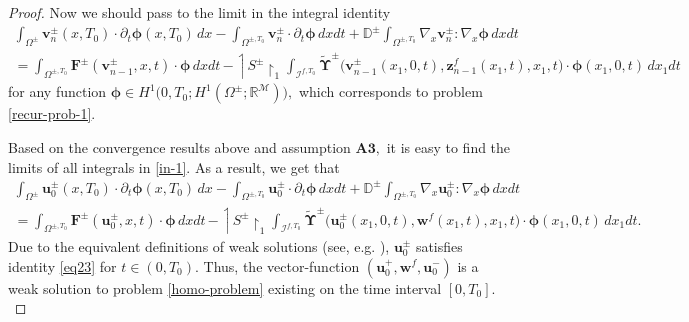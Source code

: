\documentclass[reqno]{amsart}            %
\numberwithin{equation}{section}
\begin{document}
\begin{proof}
		Now we should pass to the limit in the integral identity 
		\begin{multline}\label{in-1}
			\int_{\Omega^{\pm}} \mathbf{v}^{\pm}_n(x, T_0) \cdot \partial_t \boldsymbol{\phi}(x, T_0) \, dx	- \int_{\Omega^{\pm, T_0}} \mathbf{v}^{\pm}_n \cdot \partial_t \boldsymbol{\phi} \, dxdt + \mathbb{D}^\pm \int_{\Omega^{\pm, T_0}} \nabla_x  \mathbf{v}^{\pm}_n :  \nabla_x\boldsymbol{\phi}\,dxdt 
			\\
			= \int_{\Omega^{\pm, T_0}} \mathbf{F}^\pm(\mathbf{v}^\pm_{n-1},x, t) \cdot \boldsymbol{\phi}\, dxdt  \, - 
			\upharpoonleft\!\! {S}^\pm\!\!\upharpoonright_1 \int_{\mathcal{I}^{f, T_0}} \widetilde{\boldsymbol{\Upsilon}}^\pm\big(\mathbf{v}^\pm_{n-1}(x_1,0,t), \mathbf{z}^{f}_{n-1}(x_1,t), x_1, t \big) \cdot \boldsymbol{\phi}(x_1,0,t)\, dx_1 dt
		\end{multline}
		for any function $\boldsymbol{\phi} \in H^1\big(0,T_0; H^1(\Omega^\pm; \mathbb{R}^\mathcal{M})\big),$ which corresponds to problem \eqref{recur-prob-1}.
		
		Based on the convergence results above and assumption $\mathbf{A3},$ it is easy to find the limits of all integrals in \eqref{in-1}.
		As a result, we get that 
		\begin{multline}\label{in-2}
			\int_{\Omega^{\pm}} \mathbf{u}^{\pm}_0(x, T_0) \cdot \partial_t \boldsymbol{\phi}(x, T_0) \, dx	- \int_{\Omega^{\pm, T_0}} \mathbf{u}^{\pm}_0 \cdot \partial_t \boldsymbol{\phi} \, dxdt + \mathbb{D}^\pm \int_{\Omega^{\pm, T_0}} \nabla_x  \mathbf{u}^{\pm}_0 :  \nabla_x\boldsymbol{\phi}\,dxdt 
			\\
			= \int_{\Omega^{\pm, T_0}} \mathbf{F}^\pm(\mathbf{u}^\pm_{0},x, t) \cdot \boldsymbol{\phi}\, dxdt  \, - 
			\upharpoonleft\!\! {S}^\pm\!\!\upharpoonright_1 \int_{\mathcal{I}^{f, T_0}} \widetilde{\boldsymbol{\Upsilon}}^\pm\big(\mathbf{u}^\pm_{0}(x_1,0,t), \mathbf{w}^{f}(x_1,t), x_1, t \big) \cdot \boldsymbol{\phi}(x_1,0,t)\, dx_1 dt .
		\end{multline}
		Due to the equivalent definitions of weak solutions (see, e.g. \cite[Chapt. III]{Showalter}), $\mathbf{u}^{\pm}_0$ satisfies identity \eqref{eq23} for  $t\in (0,T_0).$
		Thus, the vector-function $(\mathbf{u}^+_0, \mathbf{w}^f, \mathbf{u}^-_0)$ is a weak solution to problem \eqref{homo-problem} existing on the time interval $[0, T_0].$ 
		

\end{proof}
\end{document}
